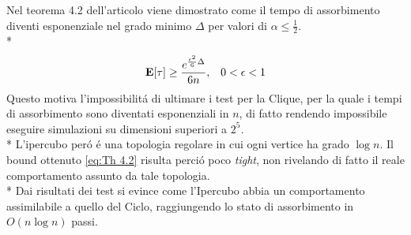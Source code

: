 \documentclass[../Tesi.tex]{subfiles}
\begin{document}
Nel teorema 4.2 dell'articolo \cite{DBLP:journals/corr/abs-2008-13589} viene dimostrato come il tempo di assorbimento diventi esponenziale nel grado minimo $\Delta$ per valori di $\alpha \leq \frac{1}{2}$.\\*
\begin{equation}
    \bold{E}[\tau] \geq \frac{e^{\frac{\epsilon^{2}}{6}\Delta}}{6n},\;\;\; 0 < \epsilon < 1
    \label{eq:Th 4.2}
\end{equation}
Questo motiva l'impossibilit\'a di ultimare i test per la Clique, per la  quale i tempi di assorbimento sono diventati esponenziali in $n$, di fatto rendendo impossibile eseguire simulazioni su dimensioni superiori a $2^{5^{\mathrm{}}}$.\\*
L'ipercubo per\'o \'e una topologia regolare in cui ogni vertice ha grado $\log{n}$. Il bound ottenuto \eqref{eq:Th 4.2} risulta perci\'o poco \emph{tight}, non rivelando di fatto il reale comportamento assunto da tale topologia.\\*
Dai risultati dei test si evince come l'Ipercubo abbia un comportamento assimilabile a quello del Ciclo, raggiungendo lo stato di assorbimento in $O(n\log{}n)$ passi.
\end{document}
